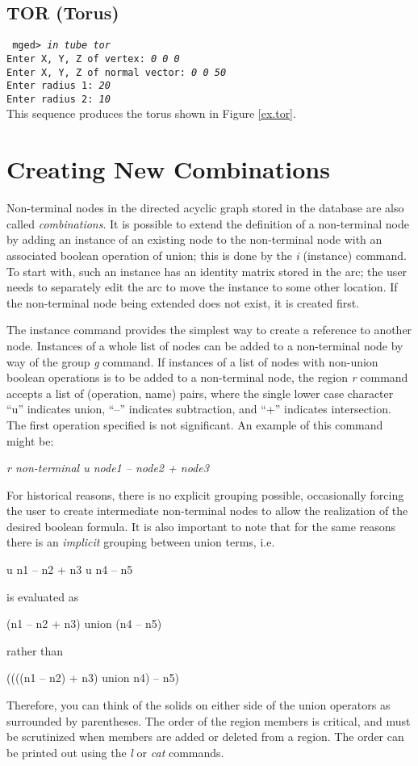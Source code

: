 \subsection{TOR (Torus)}

{\tt
mged> {\em in tube tor} \\
Enter X, Y, Z of vertex: {\em 0 0 0} \\
Enter X, Y, Z of normal vector: {\em 0 0 50} \\
Enter radius 1: {\em 20} \\
Enter radius 2: {\em 10} \\
}
This sequence produces the torus shown in Figure \ref{ex.tor}.

\section{Creating New Combinations}

Non-terminal nodes in the directed acyclic graph stored in the database
are also called {\em combinations}.
It is possible to extend the definition of a non-terminal node by
adding an instance of an existing node to the non-terminal node
with an associated boolean
operation of union;  this is done by the {\em i}
(instance) command.  To start with, such an instance has an identity
matrix stored in the arc;  the user needs to separately edit the
arc to move the instance to some other location.
If the non-terminal node being extended does not exist, it is created first.

The instance command provides the simplest way to create a reference to
another node.  Instances of a whole list of nodes can be added to a
non-terminal node by way of the group {\em g} command.
If instances of a list of nodes with non-union boolean operations
is to be added to a non-terminal node, the region {\em r} command
accepts a list of (operation, name) pairs, where the single lower case
character ``u'' indicates union, ``--'' indicates subtraction, and
``+'' indicates intersection.  The first operation specified
is not significant.  An example of this command might be:
\begin{center}
{\em r non-terminal u node1 -- node2 + node3}
\end{center}
For historical reasons,
there is no explicit grouping possible, occasionally forcing
the user to create intermediate non-terminal nodes to allow the
realization of the desired boolean formula.
It is also important to note that for the same reasons
there is an {\em implicit} grouping between union terms, i.e.
\begin{center}
u n1 -- n2 + n3 u n4 -- n5
\end{center}
is evaluated as
\begin{center}
(n1 -- n2 + n3) union (n4 -- n5)
\end{center}
rather than
\begin{center}
((((n1 -- n2) + n3) union n4) -- n5)
\end{center}
Therefore, you can think of the solids
on either side of the union operators as surrounded by parentheses.
The order of the region members is
critical, and must be scrutinized when members are added or deleted from a
region.
The order can be printed out using the {\em l} or {\em cat} commands.
